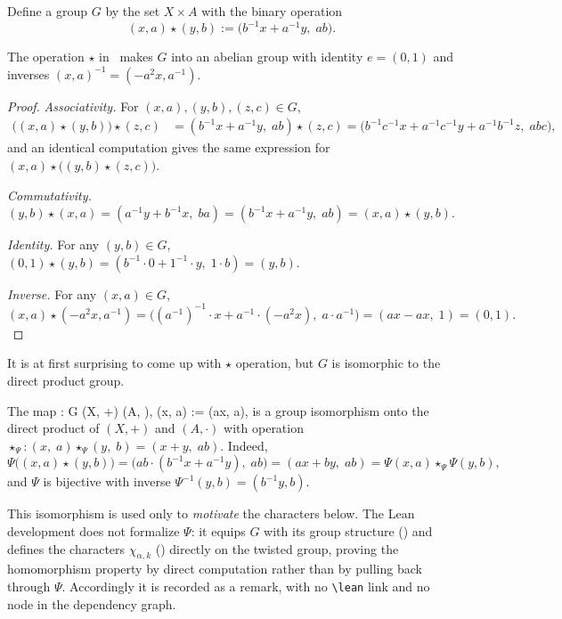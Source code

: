 Define a group $G$ by the set $X \times A$ with the binary operation
\begin{equation}\label{eq:star}
(x, a) \star (y, b) := \bigl(b^{-1}x + a^{-1}y,\; ab\bigr).
\end{equation}

\begin{lemma}\label{lem:group}\leanok
The operation $\star$ in~ makes $G$ into an abelian group with identity
$e = (0, 1)$ and inverses $(x, a)^{-1} = (-a^2 x, a^{-1})$. 
\end{lemma}

\begin{proof}\leanok
\emph{Associativity.} For $(x, a), (y, b), (z, c) \in G$,
\begin{align*}
\bigl((x, a) \star (y, b)\bigr) \star (z, c)
&= (b^{-1}x + a^{-1}y,\; ab) \star (z, c) = \bigl(b^{-1}c^{-1}x + a^{-1}c^{-1}y + a^{-1}b^{-1}z,\; abc\bigr),
\end{align*}
and an identical computation gives the same expression for $(x, a) \star \bigl((y, b) \star (z, c)\bigr)$.

\emph{Commutativity.}
$(y, b) \star (x, a) = (a^{-1}y + b^{-1}x,\; ba) = (b^{-1}x + a^{-1}y,\; ab) = (x, a) \star (y, b).$

\emph{Identity.} For any $(y, b) \in G$,
$(0, 1) \star (y, b) = (b^{-1}\cdot 0 + 1^{-1}\cdot y,\; 1\cdot b) = (y, b)$.

\emph{Inverse.} For any $(x, a) \in G$,
\[
(x, a) \star (-a^2 x, a^{-1}) = \bigl((a^{-1})^{-1}\cdot x + a^{-1}\cdot(-a^2 x),\; a\cdot a^{-1}\bigr)
= (ax - ax,\; 1) = (0, 1).
\]

\end{proof}

It is at first surprising to come up with $\star$ operation, but $G$ is isomorphic to the direct product group. 
\begin{remark}
The map
\be
\Psi : G \to (X, +) \times (A, \cdot), \qquad
\Psi(x, a) := (ax, a),
\ee
is a group isomorphism onto the direct product of $(X, +)$ and $(A, \cdot)$ with operation
$\star_\Psi:(x,\; a) \star_\Psi (y,\; b) = (x+y,\; ab)$. Indeed,
\[
\Psi\bigl((x, a) \star (y, b)\bigr) = \bigl(ab\cdot(b^{-1}x + a^{-1}y),\; ab\bigr) = (ax + by,\; ab)
= \Psi(x, a) \star_\Psi \Psi(y, b),
\]
and $\Psi$ is bijective with inverse $\Psi^{-1}(y, b) = (b^{-1}y, b)$.

This isomorphism is used only to \emph{motivate} the characters below. The Lean development does not
formalize $\Psi$: it equips $G$ with its group structure () and defines the characters
$\chi_{\alpha,k}$ () directly on the twisted group, proving the homomorphism
property by direct computation rather than by pulling back through $\Psi$. Accordingly it is recorded as a
remark, with no \texttt{\textbackslash lean} link and no node in the dependency graph.
\end{remark}

